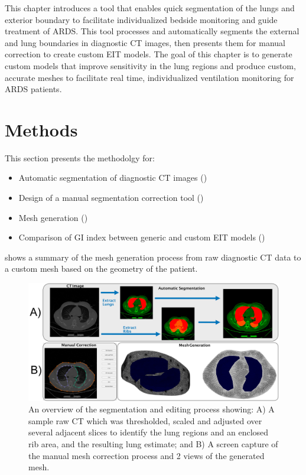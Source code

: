 This chapter introduces a tool that enables quick segmentation 
of the lungs and exterior boundary to facilitate individualized
bedside monitoring and guide treatment of ARDS.
This tool processes and automatically segments the external and lung boundaries 
in diagnostic CT images, 
then presents them for manual correction 
to create custom EIT models. 
The goal of this chapter is to generate custom models that improve sensitivity 
in the lung regions and produce custom, accurate 
meshes 
to facilitate real time, individualized ventilation
monitoring for ARDS patients.  

\section{Methods}
This section presents the methodolgy for:
\begin{itemize}
	\item Automatic segmentation of diagnostic CT images ()
	\item Design of a manual segmentation correction tool ()
	\item Mesh generation ()
	\item Comparison of GI index between generic and custom EIT models ()
\end{itemize}
 shows a summary of the mesh generation process from raw diagnostic CT 
data to a custom mesh based on the geometry of the patient.
\begin{figure}
	\centering
	\includegraphics[width=\textwidth]{chapter5-CT_to_mesh/imgs/methods_figure.pdf}
	\caption[Mesh generation method overiew.]{\label{fig:segment_overview}%
	An overview of the segmentation and editing process showing: 
	A) A sample raw CT which was thresholded, scaled and adjusted over several 
	adjacent slices to identify
	the lung regions and an enclosed rib area, and the resulting lung estimate; and
	B) A screen  capture of the manual mesh correction process and 2 views of the generated
	mesh.
	}
\end{figure}

